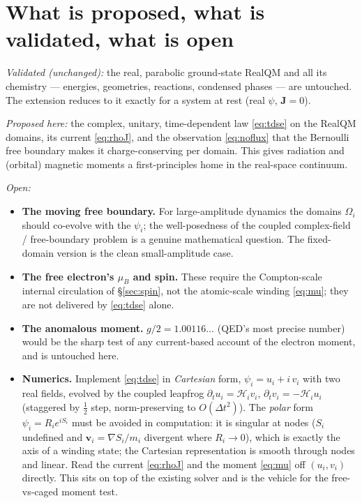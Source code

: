 \documentclass[11pt]{article}
\begin{document}
\section{What is proposed, what is validated, what is open}
\label{sec:open}

\emph{Validated (unchanged):} the real, parabolic ground-state RealQM and all its chemistry --- energies,
geometries, reactions, condensed phases --- are untouched. The extension reduces to it exactly for a
system at rest (real $\psi$, $\mathbf J=0$).

\emph{Proposed here:} the complex, unitary, time-dependent law \eqref{eq:tdse} on the RealQM domains, its
current \eqref{eq:rhoJ}, and the observation \eqref{eq:noflux} that the Bernoulli free boundary makes it
charge-conserving per domain. This gives radiation and (orbital) magnetic moments a first-principles home
in the real-space continuum.

\emph{Open:}
\begin{itemize}
\item \textbf{The moving free boundary.} For large-amplitude dynamics the domains $\Omega_i$ should
co-evolve with the $\psi_i$; the well-posedness of the coupled complex-field / free-boundary problem is a
genuine mathematical question. The fixed-domain version is the clean small-amplitude case.
\item \textbf{The free electron's $\mu_B$ and spin.} These require the Compton-scale internal circulation
of \S\ref{sec:spin}, not the atomic-scale winding \eqref{eq:mu}; they are not delivered by
\eqref{eq:tdse} alone.
\item \textbf{The anomalous moment.} $g/2 = 1.00116\ldots$ (QED's most precise number) would be the sharp
test of any current-based account of the electron moment, and is untouched here.
\item \textbf{Numerics.} Implement \eqref{eq:tdse} in \emph{Cartesian} form, $\psi_i = u_i + i\,v_i$ with
two real fields, evolved by the coupled leapfrog $\partial_t u_i = \mathcal H_i v_i$,
$\partial_t v_i = -\mathcal H_i u_i$ (staggered by $\tfrac12$ step, norm-preserving to $O(\Delta t^2)$).
The \emph{polar} form $\psi_i = R_i e^{iS_i}$ must be avoided in computation: it is singular at nodes
($S_i$ undefined and $\mathbf v_i=\nabla S_i/m_i$ divergent where $R_i\to0$), which is exactly the
axis of a winding state; the Cartesian representation is smooth through nodes and linear. Read the
current \eqref{eq:rhoJ} and the moment \eqref{eq:mu} off $(u_i,v_i)$ directly. This sits on top of the
existing solver and is the vehicle for the free-vs-caged moment test.
\end{itemize}
\end{document}
